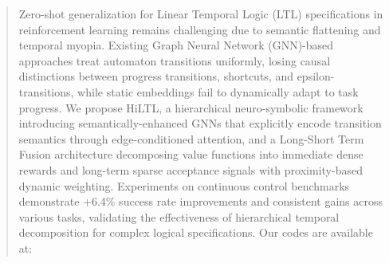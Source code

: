 \documentclass{article}
\begin{document}


\twocolumn[
\icmltitle{HiLTL: Hierarchical Temporal Logic Integration for LTL Satisfaction in Reinforcement Learning}

\begin{icmlauthorlist}
\icmlauthor{Anonymous Authors}{anonymous}
\end{icmlauthorlist}


\icmlaffiliation{anonymous}{Anonymous Institution, Under Review}
\icmlcorrespondingauthor{Anonymous}{anonymous@example.com}


\vskip 0.3in
]



\begin{abstract}
Zero-shot generalization for Linear Temporal Logic (LTL) specifications in reinforcement learning remains challenging due to semantic flattening and temporal myopia. Existing Graph Neural Network (GNN)-based approaches treat automaton transitions uniformly, losing causal distinctions between progress transitions, shortcuts, and epsilon-transitions, while static embeddings fail to dynamically adapt to task progress. We propose HiLTL, a hierarchical neuro-symbolic framework introducing semantically-enhanced GNNs that explicitly encode transition semantics through edge-conditioned attention, and a Long-Short Term Fusion architecture decomposing value functions into immediate dense rewards and long-term sparse acceptance signals with proximity-based dynamic weighting. Experiments on continuous control benchmarks demonstrate +6.4\% success rate improvements and consistent gains across various tasks, validating the effectiveness of hierarchical temporal decomposition for complex logical specifications. Our codes are available at:
\end{abstract}
\end{document}
